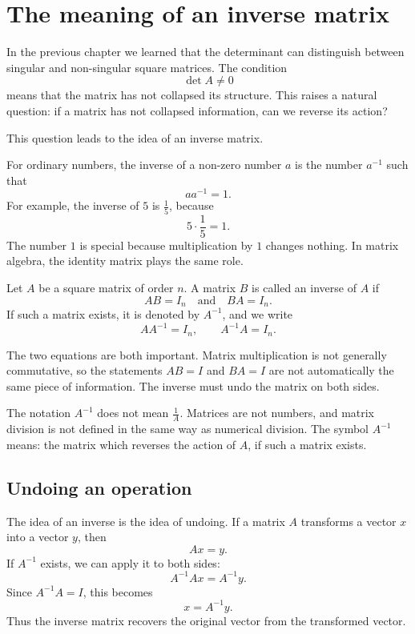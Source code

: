 \section{The meaning of an inverse matrix}

In the previous chapter we learned that the determinant can distinguish between singular and non-singular square matrices. The condition
\[
\det A\ne 0
\]
means that the matrix has not collapsed its structure. This raises a natural question: if a matrix has not collapsed information, can we reverse its action?

This question leads to the idea of an inverse matrix.

For ordinary numbers, the inverse of a non-zero number \(a\) is the number \(a^{-1}\) such that
\[
a a^{-1}=1.
\]
For example, the inverse of \(5\) is \(\frac15\), because
\[
5\cdot \frac15=1.
\]
The number \(1\) is special because multiplication by \(1\) changes nothing. In matrix algebra, the identity matrix plays the same role.

\begin{definitionbox}
Let \(A\) be a square matrix of order \(n\). A matrix \(B\) is called an inverse of \(A\) if
\[
AB=I_n
\quad \text{and} \quad
BA=I_n.
\]
If such a matrix exists, it is denoted by \(A^{-1}\), and we write
\[
AA^{-1}=I_n,
\qquad
A^{-1}A=I_n.
\]
\end{definitionbox}

The two equations are both important. Matrix multiplication is not generally commutative, so the statements \(AB=I\) and \(BA=I\) are not automatically the same piece of information. The inverse must undo the matrix on both sides.

\begin{remarkbox}
The notation \(A^{-1}\) does not mean \(\frac1A\). Matrices are not numbers, and matrix division is not defined in the same way as numerical division. The symbol \(A^{-1}\) means: the matrix which reverses the action of \(A\), if such a matrix exists.
\end{remarkbox}

\subsection{Undoing an operation}

The idea of an inverse is the idea of undoing. If a matrix \(A\) transforms a vector \(x\) into a vector \(y\), then
\[
Ax=y.
\]
If \(A^{-1}\) exists, we can apply it to both sides:
\[
A^{-1}Ax=A^{-1}y.
\]
Since \(A^{-1}A=I\), this becomes
\[
x=A^{-1}y.
\]
Thus the inverse matrix recovers the original vector from the transformed vector.

